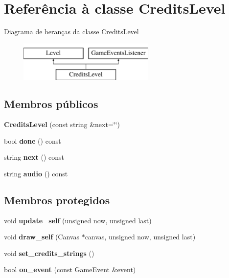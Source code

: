\hypertarget{classCreditsLevel}{}\section{Referência à classe Credits\+Level}
\label{classCreditsLevel}
Diagrama de heranças da classe Credits\+Level\begin{figure}[H]
\begin{center}
\leavevmode
\includegraphics[height=2.000000cm]{classCreditsLevel}
\end{center}
\end{figure}
\subsection*{Membros públicos}
\begin{DoxyCompactItemize}
\item 
\mbox{\label{classCreditsLevel_a2516ba82d10b2eb959d03eea3df0a32c}} 
{\bfseries Credits\+Level} (const string \&next=\char`\"{}\char`\"{})
\item 
\mbox{\label{classCreditsLevel_a80b93759949ba662627b52d0a51325ce}} 
bool {\bfseries done} () const
\item 
\mbox{\label{classCreditsLevel_ad8c392e8e0175052a4451481bddaddfe}} 
string {\bfseries next} () const
\item 
\mbox{\label{classCreditsLevel_a6bf8924562bb2ce7f8b85c35a9b8a52e}} 
string {\bfseries audio} () const
\end{DoxyCompactItemize}
\subsection*{Membros protegidos}
\begin{DoxyCompactItemize}
\item 
\mbox{\label{classCreditsLevel_a2df0795f16916cab12337010ee18f46c}} 
void {\bfseries update\+\_\+self} (unsigned now, unsigned last)
\item 
\mbox{\label{classCreditsLevel_af980e138ebbad6f73b3835f38ee4dfe6}} 
void {\bfseries draw\+\_\+self} (Canvas $\ast$canvas, unsigned now, unsigned last)
\item 
\mbox{\label{classCreditsLevel_a627849460d0ed66cfdc491fbdd313388}} 
void {\bfseries set\+\_\+credits\+\_\+strings} ()
\item 
\mbox{\label{classCreditsLevel_afa4ec08490398e3532fce7815c77aa46}} 
bool {\bfseries on\+\_\+event} (const Game\+Event \&event)
\end{DoxyCompactItemize}
